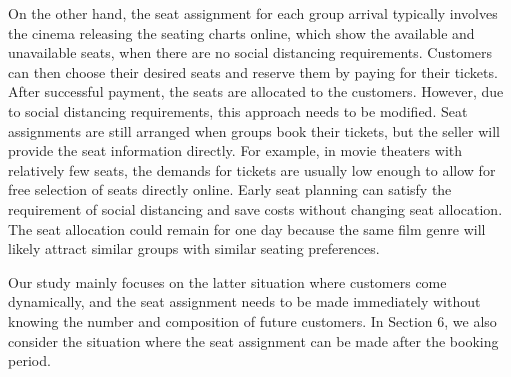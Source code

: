 On the other hand, the seat assignment for each group arrival typically involves the cinema releasing the seating charts online, which show the available and unavailable seats, when there are no social distancing requirements. Customers can then choose their desired seats and reserve them by paying for their tickets. After successful payment, the seats are allocated to the customers. However, due to social distancing requirements, this approach needs to be modified. Seat assignments are still arranged when groups book their tickets, but the seller will provide the seat information directly. For example, in movie theaters with relatively few seats, the demands for tickets are usually low enough to allow for free selection of seats directly online. Early seat planning can satisfy the requirement of social distancing and save costs without changing seat allocation. The seat allocation could remain for one day because the same film genre will likely attract similar groups with similar seating preferences.


Our study mainly focuses on the latter situation where customers come dynamically, and the seat assignment needs to be made immediately without knowing the number and composition of future customers. In Section 6, we also consider the situation where the seat assignment can be made after the booking period. 



